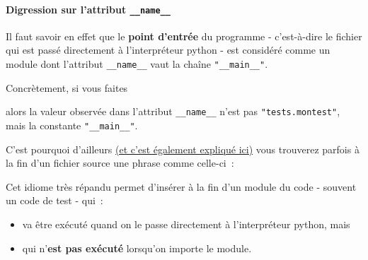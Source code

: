     \hypertarget{digression-sur-lattribut-__name__}{%
\paragraph{\texorpdfstring{Digression sur l'attribut
\texttt{\_\_name\_\_}}{Digression sur l'attribut \_\_name\_\_}}\label{digression-sur-lattribut-__name__}}

    Il faut savoir en effet que le \textbf{point d'entrée} du programme -
c'est-à-dire le fichier qui est passé directement à l'interpréteur
python - est considéré comme un module dont l'attribut
\texttt{\_\_name\_\_} vaut la chaîne \texttt{"\_\_main\_\_"}.

Concrètement, si vous faites

\begin{Shaded}
\begin{Highlighting}[frame=lines,framerule=0.6mm,rulecolor=\color{asisframecolor}]
\end{Highlighting}
\end{Shaded}

alors la valeur observée dans l'attribut \texttt{\_\_name\_\_} n'est pas
\texttt{"tests.montest"}, mais la constante \texttt{"\_\_main\_\_"}.

    C'est pourquoi d'ailleurs
\href{https://docs.python.org/3/tutorial/modules.html\#executing-modules-as-scripts}{(et
c'est également expliqué ici)} vous trouverez parfois à la fin d'un
fichier source une phrase comme celle-ci~:

    \begin{Shaded}
\begin{Highlighting}[frame=lines,framerule=0.6mm,rulecolor=\color{asisframecolor}]
  \OperatorTok{==} \NormalTok{:}
    \OperatorTok{<}\OperatorTok{>}
    \OperatorTok{<}\OperatorTok{>}
\end{Highlighting}
\end{Shaded}

    Cet idiome très répandu permet d'insérer à la fin d'un module du code -
souvent un code de test - qui~:

\begin{itemize}
\tightlist
\item
  va être exécuté quand on le passe directement à l'interpréteur python,
  mais
\item
  qui n'\textbf{est pas exécuté} lorsqu'on importe le module.
\end{itemize}


